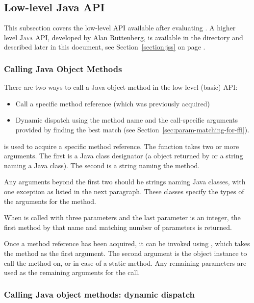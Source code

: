 \documentclass[10pt]{book}
\begin{document}
\subsection{Low-level Java API}

This subsection covers the low-level API available after evaluating
.  A higher level \textsc{Java} API, developed by Alan
Ruttenberg, is available in the  directory and described
later in this document, see Section~\ref{section:jss} on page
\pageref{section:jss}.

\subsubsection{Calling Java Object Methods}

There are two ways to call a Java object method in the low-level (basic) API:

\begin{itemize}
\item Call a specific method reference (which was previously acquired)
\item Dynamic dispatch using the method name and the call-specific
  arguments provided by finding the best match (see
  Section~\ref{sec:param-matching-for-ffi}).
\end{itemize}

 is used to acquire a specific method reference.  The
function takes two or more arguments. The first is a Java class
designator (a  object returned by
 or a string naming a Java class). The second is a
string naming the method.

Any arguments beyond the first two should be strings naming Java
classes, with one exception as listed in the next paragraph. These
classes specify the types of the arguments for the method.

When  is called with three parameters and the last
parameter is an integer, the first method by that name and matching
number of parameters is returned.

Once a method reference has been acquired, it can be invoked using
, which takes the method as the first argument. The
second argument is the object instance to call the method on, or
 in case of a static method.  Any remaining parameters are
used as the remaining arguments for the call.

\subsubsection{Calling Java object methods: dynamic dispatch}
\end{document}
